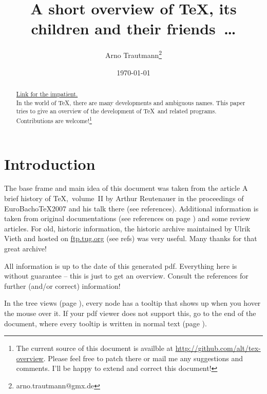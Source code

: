 \documentclass{scrartcl}
\title{A short overview of \TeX, its children and their friends~\dots}
\author{Arno Trautmann\thanks{arno.trautmann@gmx.de}}
\date{\today}
\begin{document}
\maketitle

\begin{abstract}
{\centering \large \hyperref[textextview]{Link for the impatient.}\\[2ex]}
In the world of \TeX, there are many developments and ambiguous names. This paper tries to give an overview of the development of \TeX\ and related programs. Contributions are welcome!\footnote{The current source of this document is availble at \url{http://github.com/alt/tex-overview}. Please feel free to patch there or mail me any suggestions and comments. I'll be happy to extend and correct this document!}\\
\end{abstract}

\section{Introduction}
The base frame and main idea of this document was taken from the article \textsf{A brief history of \TeX,~volume~II} by Arthur Reutenauer in the proceedings of \textsf{EuroBacho\TeX 2007} and his talk there (see references). Additional information is taken from original documentations (see references on page \pageref{sec:refs}) and some review articles. For old, historic information, the \textsf{historic archive} maintained by Ulrik Vieth and hosted on \url{ftp.tug.org} (see refs) was very useful. Many thanks for that great archive!

All information is up to the date of this generated pdf. Everything here is without guarantee – this is just to get an overview. Consult the references for further (and/or correct) information! 

In the tree views (page \pageref{sec:tree}), every node has a tooltip that shows up when you hover the mouse over it. If your pdf viewer does not support this, go to the end of the document, where every tooltip is written in normal text (page \pageref{sec:text}).
\end{document}

